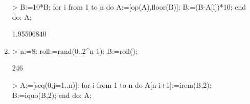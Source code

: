 \begin{enumerate}
\begin{MapleInput}
> B:=10*B; 
  for i from 1 to n do 
    A:=[op(A),floor(B)]; 
    B:=(B-A[i])*10; 
  end do: 
  A;
\end{MapleInput}
\begin{MapleOutputGather}
1.95506840 \notag \\
[1, 9, 5, 5, 0, 6, 8, 4] \notag
\end{MapleOutputGather}
                          
\item
\begin{MapleInput}
> n:=8: 
  roll:=rand(0..2^n-1): 
  B:=roll();
\end{MapleInput}
\begin{MapleOutput}
246
\end{MapleOutput}

\begin{MapleInput}
> A:=[seq(0,j=1..n)]: 
  for i from 1 to n do 
    A[n-i+1]:=irem(B,2); 
    B:=iquo(B,2);
  end do: 
  A;
\end{MapleInput}
\begin{MapleOutput}
[1, 1, 1, 1, 0, 1, 1, 0]
\end{MapleOutput}

\end{enumerate}